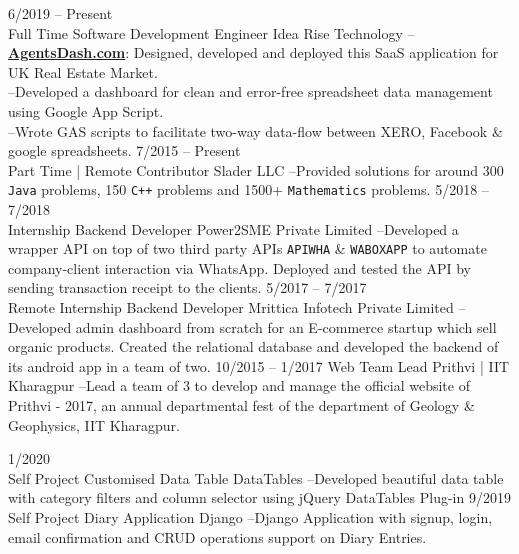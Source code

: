\documentclass[8pt]{developercv} %
\begin{document}
\begin{entrylist}
	\entry
		{6/2019 -- Present\\\footnotesize{Full Time}}
		{Software Development Engineer}
		{Idea Rise Technology}
		{--\href{https://agentsdash.com}{\textbf{AgentsDash.com}}: Designed, developed and deployed this SaaS application for UK Real Estate Market.  \\ --Developed a dashboard for clean and error-free spreadsheet data management using Google App Script.\\ --Wrote GAS scripts to facilitate two-way data-flow between XERO, Facebook \& google spreadsheets.}
	\entry
		{7/2015 -- Present\\\footnotesize{Part Time | Remote}}
		{Contributor}
		{Slader LLC}
		{--Provided solutions for around 300 \texttt{Java} problems, 150 \texttt{C++} problems and 1500+ \texttt{Mathematics} problems.}
	\entry
		{5/2018 -- 7/2018\\\footnotesize{Internship}}
		{Backend Developer}
		{Power2SME Private Limited}
		{--Developed a wrapper API on top of two third party APIs \texttt{APIWHA} \& \texttt{WABOXAPP} to automate company-client interaction via WhatsApp. Deployed and tested the API by sending transaction receipt to the clients.}
	\entry
		{5/2017 -- 7/2017\\\footnotesize{Remote Internship}}
		{Backend Developer}
		{Mrittica Infotech Private Limited}
		{--Developed admin dashboard from scratch for an E-commerce startup which sell organic products. Created the relational database and developed the backend of its android app in a team of two.}
	\entry
		{10/2015 -- 1/2017}
		{Web Team Lead}
		{Prithvi | IIT Kharagpur}
		{--Lead a team of 3 to develop and manage the official website of Prithvi - 2017, an annual departmental fest of the department of Geology \& Geophysics, IIT Kharagpur.}
\end{entrylist}
\begin{entrylist}
	\entry
		{1/2020 \\\footnotesize{Self Project}}
		{Customised Data Table}
		{DataTables}
		{--Developed beautiful data table with category filters and column selector using jQuery DataTables Plug-in}
	\entry
		{9/2019 \\\footnotesize{Self Project}}
		{Diary Application}
		{Django}
		{--Django Application with signup, login, email confirmation and CRUD operations support on Diary Entries.}
\end{entrylist}
\end{document}
